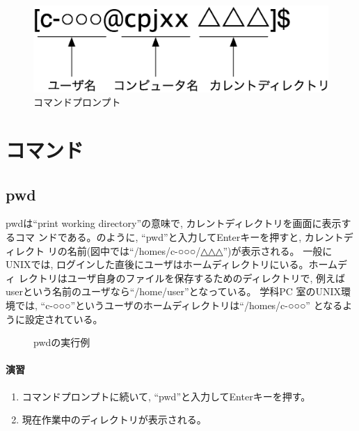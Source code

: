 \begin{figure}[htbp]
\begin{center}
\includegraphics[width=0.5\linewidth]{prompt.eps}
\caption{コマンドプロンプト}
\label{fig:prompt}
\end{center}
\end{figure}

\section{コマンド}
\subsection{pwd}

pwdは``print working directory''の意味で, カレントディレクトリを画面に表示するコマ
ンドである。のように, ``pwd''と入力してEnterキーを押すと, カレントディレクト
リの名前(図中では``/homes/c-○○○/△△△'')が表示される。
一般にUNIXでは, ログインした直後にユーザはホームディレクトリにいる。ホームディ
レクトリはユーザ自身のファイルを保存するためのディレクトリで, 例えば
userという名前のユーザなら``/home/user''となっている。
学科PC
室のUNIX環境では, ``c-○○○''というユーザのホームディレクトリは``/homes/c-○○○''
となるように設定されている。

\begin{figure}[htbp]
\begin{center}
\caption{pwdの実行例}
\label{fig:pwd}
\end{center}
\end{figure}

\paragraph{演習}

\begin{enumerate}
\item コマンドプロンプトに続いて, ``pwd''と入力してEnterキーを押す。
\item 現在作業中のディレクトリが表示される。
\end{enumerate}


